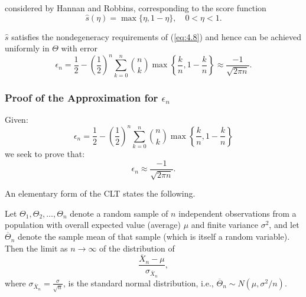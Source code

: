 \documentclass[11pt]{article}
\numberwithin{equation}{section}
\theoremstyle{boldStyle}
\begin{document}
considered by Hannan and Robbins, corresponding to the score function
\begin{equation} \label{eq:4.13}
    \hat{s}(\eta) = \max \{\eta, 1 - \eta\}, \quad 0 < \eta < 1.
\end{equation}

$\hat{s}$ satisfies the nondegeneracy requirements of (\ref{eq:4.8}) and hence can be achieved uniformly in $\Theta$ with error
\[
    \epsilon_n =  \frac{1}{2} - \left(\frac{1}{2}\right)^n \sum_{k=0}^n \binom{n}{k} \max \left\{ \frac{k}{n}, 1 - \frac{k}{n} \right\} \approx \frac{-1}{\sqrt{2\pi n}}.
\]






\subsubsection{Proof of the Approximation for $\epsilon_n$}

Given:
\[
    \epsilon_n =  \frac{1}{2} - \left(\frac{1}{2}\right)^n \sum_{k=0}^n \binom{n}{k} \max \left\{ \frac{k}{n}, 1 - \frac{k}{n} \right\}
\]
we seek to prove that:
\[
    \epsilon_n \approx \frac{-1}{\sqrt{2\pi n}}.
\]


An elementary form of the CLT states the following. 

Let \(\Theta_1, \Theta_2, \dots, \Theta_n\) denote a random sample of \(n\) independent observations 
from a population with overall expected value (average) \(\mu\) and finite variance \(\sigma^2\), and let \(\overline{\Theta}_n\) denote the 
sample mean of that sample (which is itself a random variable). Then the limit as \(n \to \infty\) of the distribution of
\[
\frac{\overline{X}_n - \mu}{\sigma_{\overline{X}_n}},
\]
where \(\sigma_{\overline{X}_n} = \frac{\sigma}{\sqrt{n}}\), is the standard normal distribution, 
i.e., \( \overline{\Theta}_n \sim N(\mu, \sigma^2/n) \).
\end{document}
